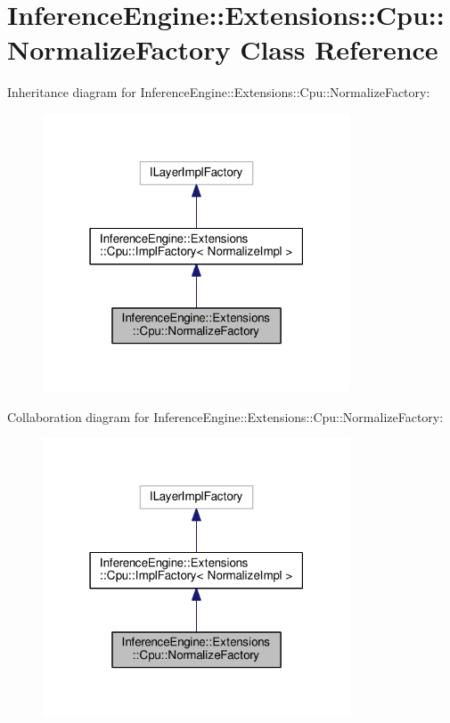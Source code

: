 \hypertarget{classInferenceEngine_1_1Extensions_1_1Cpu_1_1NormalizeFactory}{}\section{Inference\+Engine\+:\+:Extensions\+:\+:Cpu\+:\+:Normalize\+Factory Class Reference}
\label{classInferenceEngine_1_1Extensions_1_1Cpu_1_1NormalizeFactory}


Inheritance diagram for Inference\+Engine\+:\+:Extensions\+:\+:Cpu\+:\+:Normalize\+Factory\+:
\nopagebreak
\begin{figure}[H]
\begin{center}
\leavevmode
\includegraphics[width=259pt]{classInferenceEngine_1_1Extensions_1_1Cpu_1_1NormalizeFactory__inherit__graph}
\end{center}
\end{figure}


Collaboration diagram for Inference\+Engine\+:\+:Extensions\+:\+:Cpu\+:\+:Normalize\+Factory\+:
\nopagebreak
\begin{figure}[H]
\begin{center}
\leavevmode
\includegraphics[width=259pt]{classInferenceEngine_1_1Extensions_1_1Cpu_1_1NormalizeFactory__coll__graph}
\end{center}
\end{figure}
